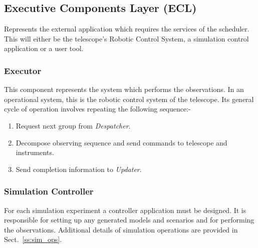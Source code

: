 \subsection{Executive Components Layer (ECL)} 
Represents the external application which requires the services of the scheduler. This will either be the telescope's Robotic Control System, a simulation control application or a user tool.
\subsubsection{Executor}
This component represents the system which performs the observations. In an operational system, this is the robotic control system of the telescope. Its general cycle of operation involves repeating the following sequence:-

\begin{enumerate}
\item Request next group from \emph{Despatcher}. 
\item Decompose observing sequence and send commands to telescope and instruments.
\item Send completion information to \emph{Updater}.
\end{enumerate}

\subsubsection{Simulation Controller}
For each simulation experiment a controller application must be designed. It is responsible for setting up any generated models and scenarios and for performing the observations. Additional details of simulation operations are provided in Sect.~\ref{ss:sim_ops}.
